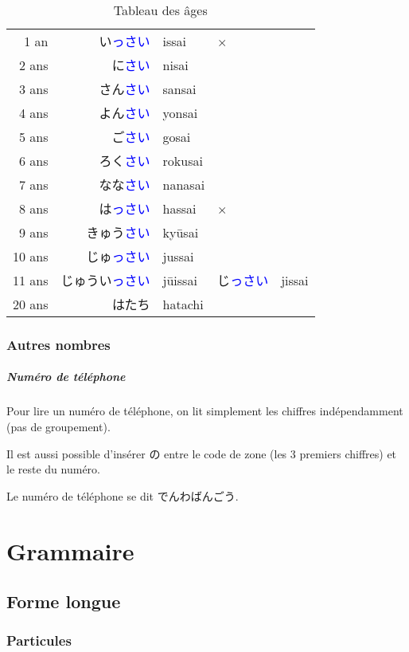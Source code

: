 \documentclass[a4paper,10pt,french,openany]{memoir}
\newcommand{\term}[1]{\textcolor{blue}{#1}}
\begin{document}
\begin{table}[htbp]
 \centering
 \caption{Tableau des âges}
 \label{tab:age}
 \begin{tabular}{rrlll}
  1 an  & い\term{っさい} &issai&×\\
  2 ans & に\term{さい} &nisai\\
  3 ans & さん\term{さい} &sansai\\
  4 ans & よん\term{さい} &yonsai\\
  5 ans & ご\term{さい} &gosai\\
  6 ans & ろく\term{さい} &rokusai\\
  7 ans & なな\term{さい} &nanasai\\
  8 ans & は\term{っさい} &hassai&×\\
  9 ans & きゅう\term{さい} &kyūsai\\
  10 ans& じゅ\term{っさい} &jussai\\
  11 ans& じゅうい\term{っさい}&jūissai & じ\term{っさい} & jissai\\
  20 ans& はたち &hatachi
 \end{tabular}
\end{table}

\subsection{Autres nombres}

\paragraph{Numéro de téléphone}

Pour lire un numéro de téléphone, on lit simplement les chiffres indépendamment (pas de groupement).

Il est aussi possible d'insérer の entre le code de zone (les 3 premiers chiffres) et le reste du numéro.

Le numéro de téléphone se dit でんわばんごう.

\chapter{Grammaire}
\section{Forme longue}

\subsection{Particules}
\end{document}
